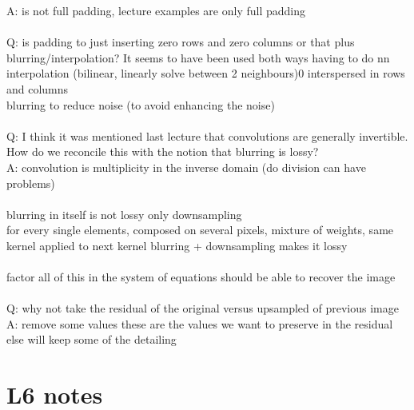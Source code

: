 \documentclass[11pt]{article}
\begin{document}
A: is not full padding, lecture examples are only full padding
\\\\
\noindent
Q: is padding to just inserting zero rows and zero columns or that plus blurring/interpolation? It seems to have been used both ways
having to do nn interpolation (bilinear, linearly solve between 2 neighbours)0 interspersed in rows and columns
\\
blurring to reduce noise (to avoid enhancing the noise)
\\\\
Q: I think it was mentioned last lecture that convolutions are generally invertible. How do we reconcile this with the notion that blurring is lossy?\\
A: convolution is multiplicity in the inverse domain (do division can have problems)\\\\
blurring in itself is not lossy
only downsampling
\\
for every single elements, composed on several pixels, mixture of weights, same kernel applied to next kernel
blurring + downsampling makes it lossy
\\\\
factor all of this in the system of equations should be able to recover the image
\\\\
Q: why not take the residual of the original versus upsampled of previous image\\
A: remove some values these are the values we want to preserve in the residual
else will keep some of the detailing 
\\
\section*{L6 notes}
\end{document}
